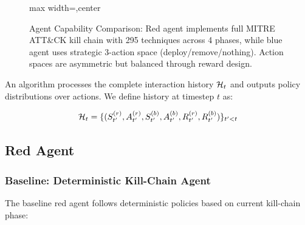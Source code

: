 \documentclass[12pt]{article}
\newcounter{phase}[algorithm]
\theoremstyle{definition}
\theoremstyle{plain}
\begin{document}
\begin{figure}[H]
\begin{adjustbox}{max width=\linewidth,center}
\end{adjustbox}
\caption{Agent Capability Comparison: Red agent implements full MITRE ATT\&CK kill chain with 295 techniques across 4 phases, while blue agent uses strategic 3-action space (deploy/remove/nothing). Action spaces are asymmetric but balanced through reward design.}
\label{fig:agent_capabilities}
\end{figure}

An algorithm processes the complete interaction history $\mathcal{H}_t$ and outputs policy distributions over actions. We define history at timestep $t$ as:

\begin{equation}
\mathcal{H}_t = \{(S_{t'}^{(r)}, A_{t'}^{(r)}, S_{t'}^{(b)}, A_{t'}^{(b)}, R_{t'}^{(r)}, R_{t'}^{(b)})\}_{t' < t}
\end{equation}

\subsection{Red Agent}

\subsubsection{Baseline: Deterministic Kill-Chain Agent}
The baseline red agent follows deterministic policies based on current kill-chain phase:
\end{document}
